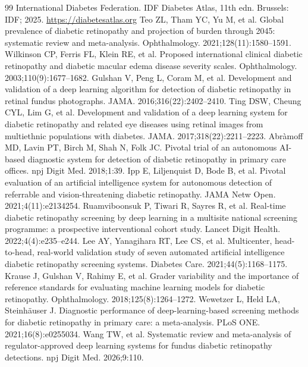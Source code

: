 \documentclass[11pt,a4paper]{article}
\begin{document}
\footnotesize
\begin{thebibliography}{99}\setlength{\itemsep}{0pt}
 International Diabetes Federation. IDF Diabetes Atlas, 11th edn. Brussels: IDF; 2025. \url{https://diabetesatlas.org}
 Teo ZL, Tham YC, Yu M, et al. Global prevalence of diabetic retinopathy and projection of burden through 2045: systematic review and meta-analysis. Ophthalmology. 2021;128(11):1580--1591.
 Wilkinson CP, Ferris FL, Klein RE, et al. Proposed international clinical diabetic retinopathy and diabetic macular edema disease severity scales. Ophthalmology. 2003;110(9):1677--1682.
 Gulshan V, Peng L, Coram M, et al. Development and validation of a deep learning algorithm for detection of diabetic retinopathy in retinal fundus photographs. JAMA. 2016;316(22):2402--2410.
 Ting DSW, Cheung CYL, Lim G, et al. Development and validation of a deep learning system for diabetic retinopathy and related eye diseases using retinal images from multiethnic populations with diabetes. JAMA. 2017;318(22):2211--2223.
 Abr\`amoff MD, Lavin PT, Birch M, Shah N, Folk JC. Pivotal trial of an autonomous AI-based diagnostic system for detection of diabetic retinopathy in primary care offices. npj Digit Med. 2018;1:39.
 Ipp E, Liljenquist D, Bode B, et al. Pivotal evaluation of an artificial intelligence system for autonomous detection of referrable and vision-threatening diabetic retinopathy. JAMA Netw Open. 2021;4(11):e2134254.
 Ruamviboonsuk P, Tiwari R, Sayres R, et al. Real-time diabetic retinopathy screening by deep learning in a multisite national screening programme: a prospective interventional cohort study. Lancet Digit Health. 2022;4(4):e235--e244.
 Lee AY, Yanagihara RT, Lee CS, et al. Multicenter, head-to-head, real-world validation study of seven automated artificial intelligence diabetic retinopathy screening systems. Diabetes Care. 2021;44(5):1168--1175.
 Krause J, Gulshan V, Rahimy E, et al. Grader variability and the importance of reference standards for evaluating machine learning models for diabetic retinopathy. Ophthalmology. 2018;125(8):1264--1272.
 Wewetzer L, Held LA, Steinh\"auser J. Diagnostic performance of deep-learning-based screening methods for diabetic retinopathy in primary care: a meta-analysis. PLoS ONE. 2021;16(8):e0255034.
 Wang TW, et al. Systematic review and meta-analysis of regulator-approved deep learning systems for fundus diabetic retinopathy detections. npj Digit Med. 2026;9:110.

\end{thebibliography}
\end{document}

